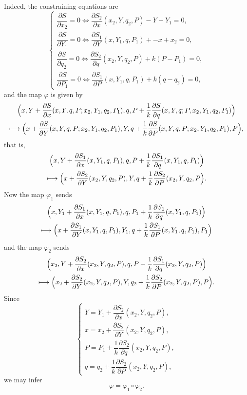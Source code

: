 \documentclass[JEP,XML,SOM,NoFloatCountersInSection,Unicode,published]{cedram}
\newcommand\mto{\mathchoice{\longmapsto}{\mapsto}{\mapsto}{\mapsto}}
\numberwithin{equation}{section}
\theoremstyle{plain}
\theoremstyle{definition}
\theoremstyle{remark}
\begin{document}
Indeed, the constraining equations are
\[
\begin{cases}
\dfrac{\partial S}{\partial x_{2}}=0 \iff \dfrac{\partial S_{2}}{\partial x}(x_{2},Y,q_{2},P) -Y+Y_{1}=0, \\[8pt]
\dfrac{\partial S}{\partial Y_{1}}=0 \iff \dfrac{\partial S_{1}}{\partial Y}(x,Y_{1},q,P_{1})+ -x+x_{2}=0, \\[8pt]
\dfrac{\partial S}{\partial q_{2}}=0 \iff \dfrac{\partial S_{2}}{\partial q}(x_{2},Y,q_{2},P)+k(P-P_{1})=0, \\[8pt]
\dfrac{\partial S}{\partial P_{1}}=0 \iff \dfrac{\partial S_{1}}{\partial P}(x,Y_{1},q,P_{1})+k (q-q_{2})=0,
\end{cases}
\]
and the map $\varphi$ is given by
\begin{multline*}
\Bigl (x, Y+ \frac{\partial S}{\partial x}(x,Y,q,P;x_{2},Y_{1},q_{2},P_{1}), q, P+\frac{1}{k} \frac{\partial S}{\partial q}(x,Y,q;P,x_{2},Y_{1},q_{2},P_{1})\Bigr)\\
\mto \Bigl (x+\frac{\partial S}{\partial Y}(x,Y,q,P;x_{2},Y_{1},q_{2},P_{1}), Y, q+\frac{1}{k}\frac{\partial S}{\partial P}(x,Y,q,P;x_{2},Y_{1},q_{2},P_{1}),P\Bigr),
\end{multline*}
that is,
\begin{multline*}
\Bigl (x, Y+ \frac{\partial S_{1}}{\partial x}(x,Y_{1},q,P_{1}), q, P+\frac{1}{k} \frac{\partial S_{1}}{\partial q}(x,Y_{1},q,P_{1})\Bigr)\\
\mto \Bigl (x+\frac{\partial S_{2}}{\partial Y}(x_{2},Y,q_{2},P), Y, q+\frac{1}{k}\frac{\partial S_{2}}{\partial P}(x_{2},Y,q_{2},P \Bigr).
\end{multline*}
Now the map $\varphi_{1}$ sends
\begin{multline*}
\Bigl (x, Y_{1}+ \frac{\partial S_{1}}{\partial x}(x,Y_{1},q,P_{1}), q, P_{1}+\frac{1}{k} \frac{\partial S_{1}}{\partial q}(x,Y_{1},q,P_{1})\Bigr) \\
\mto \Bigl (x+ \frac{\partial S_{1}}{\partial Y_{}}(x,Y_{1},q,P_{1}),Y_{1}, q+ \frac{1}{k}\frac{\partial S_{1}}{\partial P_{}}(x,Y_{1},q,P_{1}), P_{1} \Bigr)
\end{multline*}
and the map $\varphi_{2}$ sends
\begin{multline*}
\Bigl (x_{2}, Y+ \frac{\partial S_{2}}{\partial x_{}}(x_{2},Y,q_{2},P), q, P+\frac{1}{k} \frac{\partial S_{1}}{\partial q_{}}(x_{2},Y,q_{2},P)\Bigr) \\
\mto \Bigl (x_{2}+ \frac{\partial S_{2}}{\partial Y}(x_{2},Y,q_{2},P),Y, q_{2}+ \frac{1}{k}\frac{\partial S_{2}}{\partial P}(x_{2},Y,q_{2},P), P \Bigr).
\end{multline*}
Since
\[
\begin{cases}
Y=Y_{1}+ \dfrac{\partial S_{2}}{\partial x}(x_{2},Y,q_{2},P), \\[8pt]
x=x_2 + \dfrac{\partial S_{2}}{\partial Y}(x_{2},Y,q_{2},P), \\[8pt]
P=P_{1}+ \dfrac{1}{k} \dfrac{\partial S_{2}}{\partial q}(x_{2},Y,q_{2},P), \\[8pt]
q=q_{2} + \dfrac{1}{k} \dfrac{\partial S_{2}}{\partial P}(x_{2},Y,q_{2},P),
\end{cases}
\]
we may infer
\[
\varphi= \varphi_1 \circ \varphi_2.
\]
\end{document}
